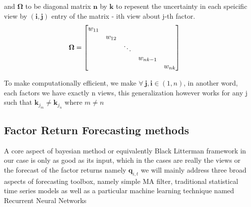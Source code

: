 \documentclass[12pt]{article}
\numberwithin{equation}{section}
\begin{document}
and $\boldsymbol{\Omega}$ to be diagonal matrix $\textbf{n}$ by $\textbf{k}$ to repesent the uncertainty in each speicific view by $(\textbf{i},\textbf{j})$ entry of the matrix - ith view about j-th factor.
\begin{align}
\boldsymbol{\Omega} & =
\begin{bmatrix}
    w_{11} &\hfill  &\hfill  &\hfill  &\hfill \\
    &\hfill w_{12}  &\hfill  &\hfill  &\hfill \\
    &\hfill &\ddots &\hfill  &\hfill \\
    &\hfill &\hfill &\hfill  w_{nk-1} &\hfill \\
    &\hfill &\hfill &\hfill  &\hfill  w_{nk}\\
\end{bmatrix}
\end{align}

To make computationally efficient, we make $\forall \ \textbf{j}, \textbf{i} \in (1,n)$, in another word, each factors we have exactly n views, this generalization however works for any j such that $\textbf{k}_{j_{m}} \neq \textbf{k}_{j_{n}}$ where  $m \neq n$




\subsection{Factor Return Forecasting methods}
A core aspect of bayesian method or equivalently Black Litterman framework in our case is only as good as its input, which in the cases are really the views or the forecast of the factor returns namely $\textbf{q}_{i,t}$ we will mainly address three broad aspects of forecasting toolbox, namely simple MA filter, traditional statistical time series models as well as a particular machine learning technique named Recurrent Neural Networks
\end{document}
